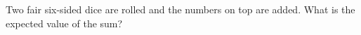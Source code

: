 Two fair six-sided dice are rolled and the numbers on top are added. What is the expected value of the sum?
